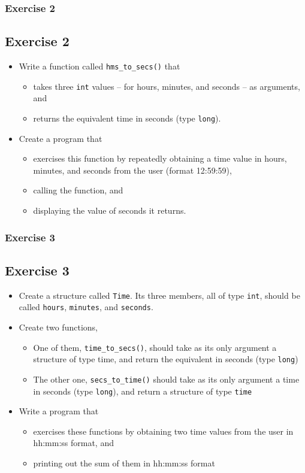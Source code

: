 \documentclass{beamer}
\begin{document}
\begin{frame}
    \frametitle{Exercise 2}
    \subsection{Exercise 2} %
    \label{sub:exercise_2}
    \begin{itemize}
        \item Write a function called \texttt{hms\_to\_secs()} that
        \begin{itemize}
            \item takes three \texttt{int} values -- for hours, minutes, and seconds -- as arguments, and
            \item returns the equivalent time in seconds (type \texttt{long}).
        \end{itemize}
        \item Create a program that
        \begin{itemize}
            \item exercises this function by repeatedly obtaining a time value in hours, minutes, and seconds from the user (format 12:59:59),
            \item calling the function, and
            \item displaying the value of seconds it returns.
        \end{itemize}
    \end{itemize}
\end{frame}

\begin{frame}
    \frametitle{Exercise 3}
    \subsection{Exercise 3} %
    \label{sub:exercise_3}
    \begin{itemize}
        \item Create a structure called \texttt{Time}. Its three members, all of type \texttt{int}, should be called \texttt{hours}, \texttt{minutes}, and \texttt{seconds}.
        \item Create two functions,
        \begin{itemize}
            \item One of them, \texttt{time\_to\_secs()}, should take as its only argument a structure of type time, and return the equivalent in seconds (type \texttt{long})
            \item The other one, \texttt{secs\_to\_time()} should take as its only argument a time in seconds (type \texttt{long}), and return a structure of type \texttt{time}
        \end{itemize}
        \item Write a program that
        \begin{itemize}
            \item exercises these functions by obtaining two time values from the user in hh:mm:ss format, and
            \item printing out the sum of them in hh:mm:ss format
        \end{itemize}
    \end{itemize}
\end{frame}
\end{document}
